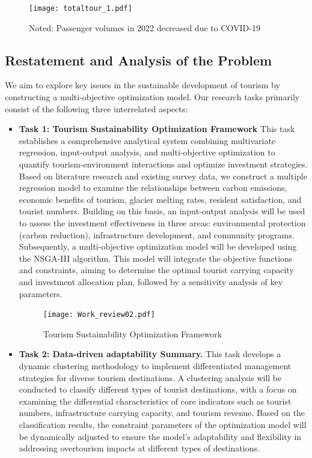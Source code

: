 \documentclass{mcmthesis}
\begin{document}
\begin{figure}[h] 
  \centering
  \texttt{[image: totaltour\_1.pdf]}
  \caption*{Noted: Passenger volumes in 2022 decreased due to COVID-19}\label{fig1}
  \end{figure}

  \subsection{Restatement and Analysis of the Problem}

  We aim to explore key issues in the sustainable development of tourism by constructing a 
  multi-objective optimization model. Our research tasks primarily consist of the following three 
  interrelated aspects:
\begin{itemize}
  \item \textbf{Task 1:  Tourism Sustainability Optimization Framework} This task establishes a comprehensive analytical system combining multivariate regression, input-output analysis, and multi-objective optimization to quantify tourism-environment interactions and optimize investment strategies. Based on literature research and existing survey data, we construct a multiple regression model to examine the relationships between carbon emissions, economic benefits of tourism, glacier melting rates, resident satisfaction, and tourist numbers. Building on this basis, an input-output analysis will be used to assess the investment effectiveness in three areas: environmental protection (carbon reduction), infrastructure development, and community programs. Subsequently, a multi-objective optimization model will be developed using the NSGA-III algorithm. This model will integrate the objective functions and constraints, aiming to determine the optimal tourist carrying capacity and investment allocation plan, followed by a sensitivity analysis of key parameters.
  \begin{figure}[h!] 
    \centering
    \texttt{[image: Work\_review02.pdf]}
    \caption{Tourism Sustainability Optimization Framework} \label{fig2}
  \end{figure}
  \item \textbf{Task 2: Data-driven adaptability Summary.} This task develops a dynamic clustering methodology to implement differentiated management strategies for diverse tourism destinations. A clustering analysis will be conducted to classify different types of tourist destinations, with a focus on examining the differential characteristics of core indicators such as tourist numbers, infrastructure carrying capacity, and tourism revenue. Based on the classification results, the constraint parameters of the optimization model will be dynamically adjusted to ensure the model's adaptability and flexibility in addressing overtourism impacts at different types of destinations.

\end{itemize}
\end{document}
